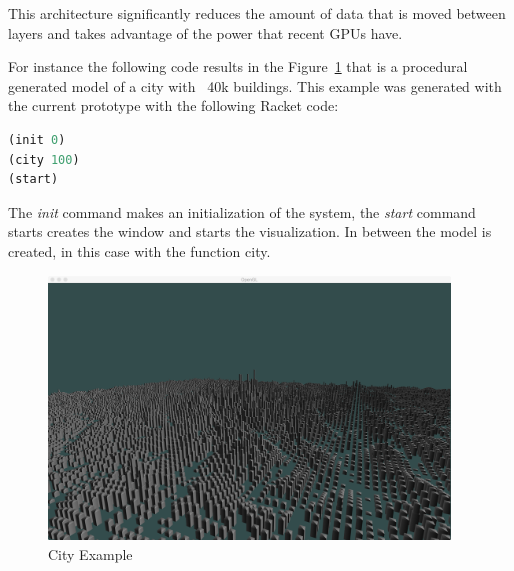 This architecture significantly reduces the amount of data that is moved between layers and takes advantage of the power that recent GPUs have.

For instance the following code results in the Figure~\ref{fig:pic1} that is a procedural generated model of a city with ~40k buildings. This example was generated with the current prototype with the following Racket code:

\begin{lstlisting}[frame=single,language=Lisp]
(init 0)
(city 100)
(start)
\end{lstlisting}

The \emph{init} command makes an initialization of the system, the \emph{start} command starts creates the window and starts the visualization. In between the model is created, in this case with the function city.

\begin{figure}[htb]
	\centering
	\includegraphics[width=0.95\textwidth]{img/Solution/City2-100*100.png}
	\caption{City Example}
	\label{fig:pic1}
\end{figure}



